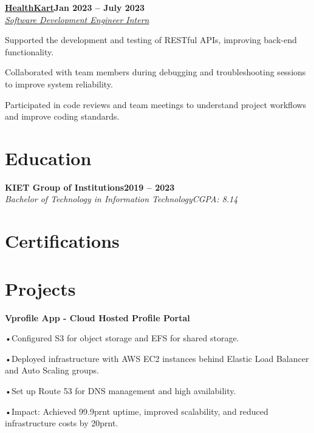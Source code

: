 \documentclass[letterpaper,10pt]{article}
\newcommand{\heading}[2]{
  \hspace{10pt}#1\hfill#2\\
}
\newcommand{\headingBf}[2]{
  \heading{\textbf{#1}}{\textbf{#2}}
}
\newcommand{\headingIt}[2]{
  \heading{\textit{#1}}{\textit{#2}}
}
\newenvironment{resume_list}{
  \vspace{-7pt}
  \begin{itemize}[itemsep=-2px, parsep=1pt, leftmargin=30pt]
}{
  \end{itemize}
}
\begin{document}
\headingBf{\href{https://www.healthcart.com}{HealthKart}}{Jan 2023 -- July 2023} 
\headingIt{\href {https://drive.google.com/file/d/1Iz83NKtrG7A1KG_rK0P8s_sAquzRm_OY/view?usp=sharing}{Software Development Engineer Intern}}{}
\begin{resume_list}
  \item Supported the development and testing of RESTful APIs, improving back-end functionality.
  \item Collaborated with team members during debugging and troubleshooting sessions to improve system reliability.  
  \item Participated in code reviews and team meetings to understand project workflows and improve coding standards.  
\end{resume_list}


\section{Education}

\headingBf{KIET Group of Institutions}{2019 -- 2023}
\headingIt{Bachelor of Technology in Information Technology}{CGPA: 8.14}

\section{Certifications}

\section{Projects}

\headingBf{ Vprofile App - Cloud Hosted Profile Portal}{}
\begin{resume_list}
  \item •Configured S3 for object storage and EFS for shared storage.
  \item •Deployed infrastructure with AWS EC2 instances behind Elastic Load Balancer and Auto Scaling groups.
  \item •Set up Route 53 for DNS management and high availability.
  \item  •Impact: Achieved 99.9prnt uptime, improved scalability, and reduced infrastructure costs by 20prnt.
\end{resume_list}
\end{document}
